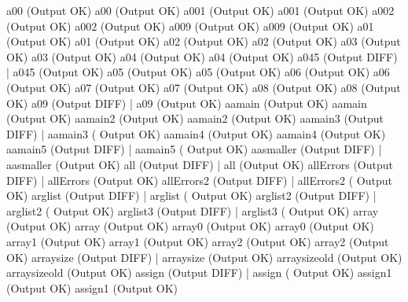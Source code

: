 \documentclass[12pt]{book}
\begin{document}
a00 (Output OK)                                        a00 (Output OK)
a001 (Output OK)                                    a001 (Output OK)
a002 (Output OK)                                    a002 (Output OK)
a009 (Output OK)                                    a009 (Output OK)
a01 (Output OK)                                        a01 (Output OK)
a02 (Output OK)                                        a02 (Output OK)
a03 (Output OK)                                        a03 (Output OK)
a04 (Output OK)                                        a04 (Output OK)
a045 (Output DIFF)                                      |    a045 (Output OK)
a05 (Output OK)                                        a05 (Output OK)
a06 (Output OK)                                        a06 (Output OK)
a07 (Output OK)                                        a07 (Output OK)
a08 (Output OK)                                        a08 (Output OK)
a09 (Output DIFF)                                      |    a09 (Output OK)
aamain (Output OK)                                    aamain (Output OK)
aamain2 (Output OK)                                    aamain2 (Output OK)
aamain3 (Output DIFF)                                      |    aamain3 (
Output OK)
aamain4 (Output OK)                                    aamain4 (Output OK)
aamain5 (Output DIFF)                                      |    aamain5 (
Output OK)
aasmaller (Output DIFF)                                      |    aasmaller 
(Output OK)
all (Output DIFF)                                      |    all (Output OK)
allErrors (Output DIFF)                                      |    allErrors 
(Output OK)
allErrors2 (Output DIFF)                                  |    allErrors2 (
Output OK)
arglist (Output DIFF)                                      |    arglist (
Output OK)
arglist2 (Output DIFF)                                      |    arglist2 (
Output OK)
arglist3 (Output DIFF)                                      |    arglist3 (
Output OK)
array (Output OK)                                    array (Output OK)
array0 (Output OK)                                    array0 (Output OK)
array1 (Output OK)                                    array1 (Output OK)
array2 (Output OK)                                    array2 (Output OK)
arraysize (Output DIFF)                                      |    arraysize 
(Output OK)
arraysizeold (Output OK)                                arraysizeold (Output
OK)
assign (Output DIFF)                                      |    assign (
Output OK)
assign1 (Output OK)                                    assign1 (Output OK)
\end{document}
